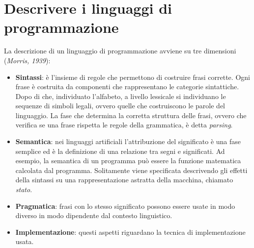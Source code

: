 \documentclass[oneside,a4paper,11pt]{book}
\theoremstyle{italicstyle}
\theoremstyle{normStyle}
\begin{document}
\section{Descrivere i linguaggi di programmazione}
La descrizione di un linguaggio di programmazione avviene su tre 
dimensioni (\textit{Morris, 1939}):
\begin{itemize}
  \item \textbf{Sintassi}: è l'insieme di regole che permettono di 
  costruire frasi corrette. Ogni frase è costruita da componenti 
  che rappresentano le categorie sintattiche. Dopo di che, 
  individuato l'alfabeto, a livello lessicale si individuano le sequenze 
  di simboli legali, ovvero quelle che costruiscono le parole del linguaggio.
  La fase che determina la corretta struttura delle frasi, ovvero 
  che verifica se una frase rispetta le regole della grammatica, è detta \textit{parsing}.
  \item \textbf{Semantica}: nei linguaggi artificiali l'attribuzione del 
  significato è una fase semplice ed è la definizione di una relazione 
  tra segni e significati. Ad esempio, la semantica di un programma 
  può essere la funzione matematica calcolata dal programma. Solitamente 
  viene specificata descrivendo gli effetti della sintassi su una 
  rappresentazione astratta della macchina, chiamato \textit{stato}.
  \item \textbf{Pragmatica}: frasi con lo stesso significato possono essere 
  usate in modo diverso in modo dipendente dal contesto linguistico.
  \item \textbf{Implementazione}: questi aspetti riguardano la tecnica 
  di implementazione usata.
\end{itemize}
\end{document}
